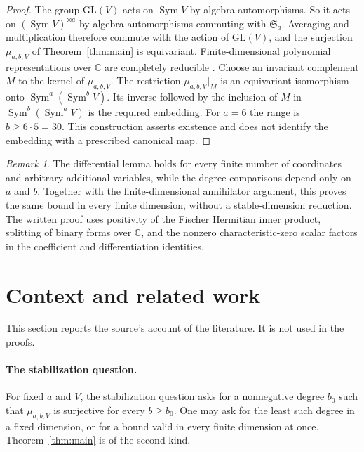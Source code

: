 \documentclass[11pt]{article}
\theoremstyle{remark}
\newtheorem{remark}[theorem]{Remark}
\DeclareMathOperator{\Sym}{Sym}
\newcommand{\C}{\mathbb C}
\newcommand{\Sa}{\mathfrak S_a}
\begin{document}
\begin{proof}
The group $\mathrm{GL}(V)$ acts on $\Sym V$ by algebra automorphisms. So it
acts on $(\Sym V)^{\otimes a}$ by algebra automorphisms commuting with
$\Sa$. Averaging and multiplication therefore commute with the action of
$\mathrm{GL}(V)$, and the surjection $\mu_{a,b,V}$ of
Theorem~\ref{thm:main} is equivariant. Finite-dimensional polynomial
representations over $\C$ are completely reducible
\cite[Chapter~I, Appendix~A, Sections~7--8]{Macdonald}. Choose an invariant
complement $M$ to the kernel of $\mu_{a,b,V}$. The restriction
$\mu_{a,b,V}|_M$ is an equivariant isomorphism onto $\Sym^a(\Sym^b V)$. Its
inverse followed by the inclusion of $M$ in $\Sym^b(\Sym^a V)$ is the
required embedding. For $a=6$ the range is $b\ge6\cdot5=30$. This
construction asserts existence and does not identify the embedding with a
prescribed canonical map.
\end{proof}

\begin{remark}
The differential lemma holds for every finite number of coordinates and
arbitrary additional variables, while the degree comparisons depend only
on $a$ and $b$. Together with the finite-dimensional annihilator argument,
this proves the same bound in every finite dimension, without a
stable-dimension reduction. The written proof uses positivity of the
Fischer Hermitian inner product, splitting of binary forms over $\C$, and
the nonzero characteristic-zero scalar factors in the coefficient and
differentiation identities.
\end{remark}

\section{Context and related work}\label{sec:context}

This section reports the source's account of the literature. It is not
used in the proofs.

\paragraph{The stabilization question.}
For fixed $a$ and $V$, the stabilization question asks for a nonnegative
degree $b_0$ such that $\mu_{a,b,V}$ is surjective for every $b\ge b_0$.
One may ask for the least such degree in a fixed dimension, or for a bound
valid in every finite dimension at once. Theorem~\ref{thm:main} is of the
second kind.
\end{document}

